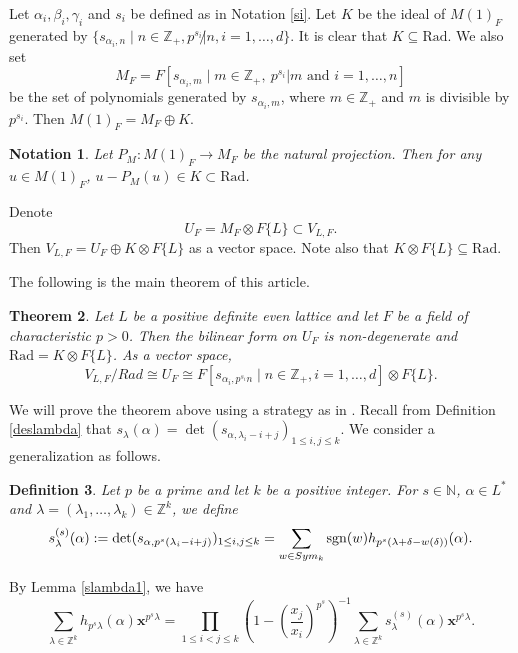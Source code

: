 \documentclass[12pt]{article}
\def\ZZ{{\mathbb Z}}
\def\NN{{\mathbb N}}
\def\sgn{{\rm sgn}}
\def\bsays#1{{\bf *** BOB SAYS: #1 ***}}
\newcommand{\x}{\mathbf{x}}
\newtheorem{thm}{Theorem}[section]
\newtheorem{de}[thm]{Definition}
\newtheorem{nota}[thm]{Notation}
\begin{document}
Let  $\alpha_i, \beta_i,\gamma_i$ and $s_i$  be defined as in Notation \ref{si}. 
Let $K$ be the ideal of $M(1)_F$ generated by 
$\{ s_{\alpha_i,n}\mid n\in \ZZ_+, {p^{s_i}\not| n}, i=1,\dots,d\}$.  It is clear that $K \subseteq \mathrm{Rad}$.  %
We also set    
\[
M_F = F[s_{\alpha_i, m}\mid    m\in \ZZ_+,\  p^{s_i}| m \text{ and }i=1, \dots, n]
\] 
be the set of polynomials generated by  $s_{\alpha_i, m}$, where $m\in \ZZ_+$ and $m$ is divisible by $p^{s_i}$. Then $M(1)_F = M_F \oplus K$. 

\begin{nota}\label{PM}
Let $P_M:M(1)_F \to M_F$ be the natural projection. Then for any $u\in M(1)_F$, 
$u-P_M(u)\in K \subset \mathrm{Rad}$.  
\end{nota}

Denote 
\[
U_F = M_F \otimes F\{L\} \subset  V_{L,F}. 
\]
Then $V_{L,F}=U_F \oplus K\otimes F\{L\}$ as a vector space. Note also that $K\otimes F\{L\} \subseteq \mathrm{Rad}$. 

The following is the main theorem of this article. 

\begin{thm}\label{main}
Let $L$ be a positive definite even lattice and let $F$ be a field of characteristic $p>0$. 
Then  the bilinear form on $U_F$ is non-degenerate and $\mathrm{Rad}=K\otimes F\{L\}$. As a vector space, 
\[
V_{L,F}/ Rad\cong U_F\cong  F[ s_{\alpha_i, p^{s_i} n}\mid  n\in \ZZ_+, i=1, \dots,d] \otimes F\{L\}. 
\]
\end{thm}

We will prove the theorem above using a strategy  as in \cite{Mu}. 
Recall from Definition \ref{deslambda} that $s_{\lambda} (\alpha)= \det(s_{\alpha, \lambda_i -i+j})_{1\leq i,j\leq k}$. We consider a generalization as follows. 

\begin{de}\label{de4.7}
Let $p$ be a prime and let $k$ be a positive integer.  For $s\in \NN$, $\alpha\in L^*$ and $\lambda=(\lambda_1, \dots, \lambda_k)\in \ZZ^k$,  
 we define 
\[
s^{(s)}_\lambda( \alpha) :=  \det(s_{\alpha, p^{s}(\lambda_i -i+j)})_{1\leq i,j\leq k}
= \sum_{w\in Sym_k} \sgn(w) h_{p^s(\lambda+\delta-w(\delta))}(\alpha).
\]
\end{de}

By Lemma \ref{slambda1}, we have 
\begin{equation} \label{form5}
\sum_{\lambda\in \ZZ^{k}} h_{p^s\lambda}(\alpha) \x^{p^s\lambda} = \prod_{1\leq i<j\leq k} (1-(\frac{x_j}{x_i})^{p^s})^{-1}\sum_{\lambda\in \ZZ^k} s^{(s)}_\lambda(\alpha) \x^{p^s\lambda} .   
\end{equation}
\end{document}
